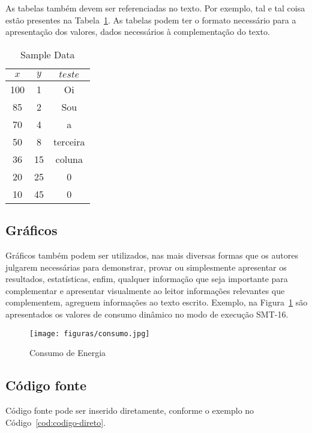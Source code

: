 \documentclass[times, 10pt,twocolumn]{article}
\begin{document}
As tabelas também devem ser referenciadas no texto. Por exemplo, tal e tal coisa estão presentes na Tabela~{\ref{tab:tabela-001}}. As tabelas podem ter o formato necessário para a apresentação dos valores, dados necessários à complementação do texto.


\begin{table}[h]
\caption {Sample Data}
\begin{center}
\begin{tabular}{|c|c|c|} \hline
$x$ & $y$ & $teste$  \\
\hline \hline
100 & 1 & Oi \\
\hline
85 & 2 & Sou  \\
\hline
70 & 4 & a  \\
\hline
50 & 8 & terceira  \\
\hline
36 & 15 & coluna  \\
\hline
20 & 25 & 0  \\
\hline
10 & 45 & 0  \\
\hline
\end{tabular}
\end{center}
\label{tab:tabela-001}
\end{table}


\subsection{Gráficos}
Gráficos também podem ser utilizados, nas mais diversas formas que os autores julgarem necessárias para demonstrar, provar ou simplesmente apresentar os resultados, estatísticas, enfim, qualquer informação que seja importante para complementar e apresentar visualmente ao leitor informações relevantes que complementem, agreguem informações ao texto escrito. Exemplo, na Figura~{\ref{fig:figura-002}} são apresentados os valores de consumo dinâmico no modo de execução SMT-16.

\begin{figure}[h]
    \centering
    \texttt{[image: figuras/consumo.jpg]}
    \caption{Consumo de Energia}
    \label{fig:figura-002}
\end{figure}

\subsection{Código fonte}

Código fonte pode ser inserido diretamente, conforme o exemplo no Código~{\ref{cod:codigo-direto}}.
\end{document}
